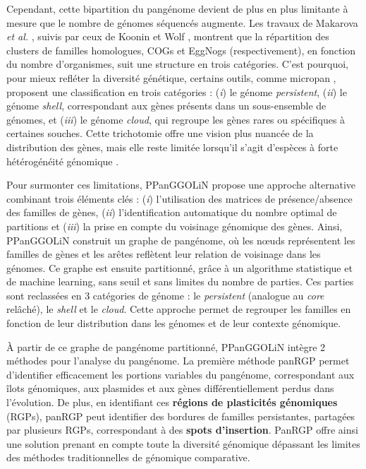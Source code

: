Cependant, cette bipartition du pangénome devient de plus en plus limitante à mesure que le nombre de génomes séquencés augmente. Les travaux de Makarova \textit{et al.} \cite{makarova_clusters_2007}, suivis par ceux de Koonin et Wolf \cite{koonin_genomics_2008}, montrent que la répartition des clusters de familles homologues, COGs \cite{tatusov_cog_2000} et EggNogs \cite{jensen_eggnog_2008} (respectivement), en fonction du nombre d'organismes, suit une structure en trois catégories. C'est pourquoi, pour mieux refléter la diversité génétique, certains outils, comme micropan \cite{snipen_micropan_2015}, proposent une classification en trois catégories : (\textit{i}) le génome \textit{persistent}, (\textit{ii}) le génome \textit{shell}, correspondant aux gènes présents dans un sous-ensemble de génomes, et (\textit{iii}) le génome \textit{cloud}, qui regroupe les gènes rares ou spécifiques à certaines souches. Cette trichotomie offre une vision plus nuancée de la distribution des gènes, mais elle reste limitée lorsqu’il s’agit d’espèces à forte hétérogénéité génomique \cite{moldovan_pangenomic_2018}.

\bigskip

Pour surmonter ces limitations, PPanGGOLiN \cite{gautreau_ppanggolin_2020} propose une approche alternative combinant trois éléments clés : (\textit{i}) l'utilisation des matrices de présence/absence des familles de gènes, (\textit{ii}) l’identification automatique du nombre optimal de partitions et (\textit{iii}) la prise en compte du voisinage génomique des gènes. Ainsi, PPanGGOLiN construit un graphe de pangénome, où les n\oe uds représentent les familles de gènes et les arêtes reflètent leur relation de voisinage dans les génomes. Ce graphe est ensuite partitionné, grâce à un algorithme statistique et de machine learning, sans seuil et sans limites du nombre de parties. Ces parties sont reclassées en 3 catégories de génome : le \textit{persistent} (analogue au \textit{core} relâché), le \textit{shell} et le \textit{cloud}. Cette approche permet de regrouper les familles en fonction de leur distribution dans les génomes et de leur contexte génomique. 

\newpage

À partir de ce graphe de pangénome partitionné, PPanGGOLiN intègre 2 méthodes pour l'analyse du pangénome. La première méthode panRGP \cite{bazin_panrgp_2020} permet d’identifier efficacement les portions variables du pangénome, correspondant aux îlots génomiques, aux plasmides et aux gènes différentiellement perdus dans l'évolution. De plus, en identifiant ces \textbf{régions de plasticités génomiques} (RGPs), panRGP peut identifier des bordures de familles persistantes, partagées par plusieurs RGPs, correspondant à des \textbf{spots d'insertion}. PanRGP offre ainsi une solution prenant en compte toute la diversité génomique dépassant les limites des méthodes traditionnelles de génomique comparative.

